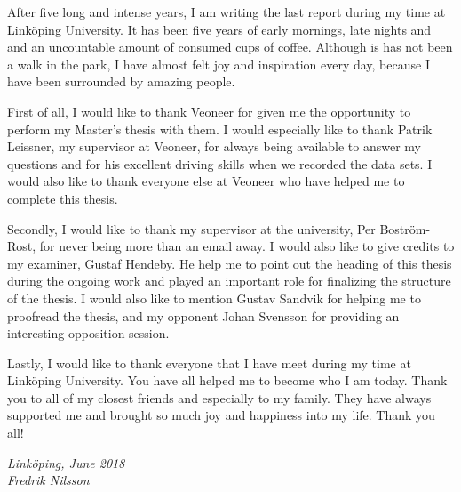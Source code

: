 \begin{acknowledgments}
After five long and intense years, I am writing the last report during my time at Link\"oping University.
It has been five years of early mornings, late nights and and an uncountable amount of consumed cups of coffee.
Although is has not been a walk in the park, I have almost felt joy and inspiration every day, because I have been surrounded by amazing people.

First of all, I would like to thank Veoneer for given me the opportunity to perform my Master's thesis with them.
I would especially like to thank Patrik Leissner, my supervisor at Veoneer, for always being available to answer my questions and for his excellent driving skills when we recorded the data sets.
I would also like to thank everyone else at Veoneer who have helped me to complete this thesis.

Secondly, I would like to thank my supervisor at the university, Per Bostr\"om-Rost, for never being more than an email away.
I would also like to give credits to my examiner, Gustaf Hendeby.
He help me to point out the heading of this thesis during the ongoing work and played an important role for finalizing the structure of the thesis.
I would also like to mention Gustav Sandvik for helping me to proofread the thesis, and my opponent Johan Svensson for providing an interesting opposition session.

Lastly, I would like to thank everyone that I have meet during my time at Link\"oping University.
You have all helped me to become who I am today.
Thank you to all of my closest friends and especially to my family.
They have always supported me and brought so much joy and happiness into my life.
Thank you all!

  \addvspace{1em}
  \begin{flushright}
    \textit{%
      Linköping, June 2018\\
      Fredrik Nilsson%
    }
  \end{flushright}
\end{acknowledgments}
